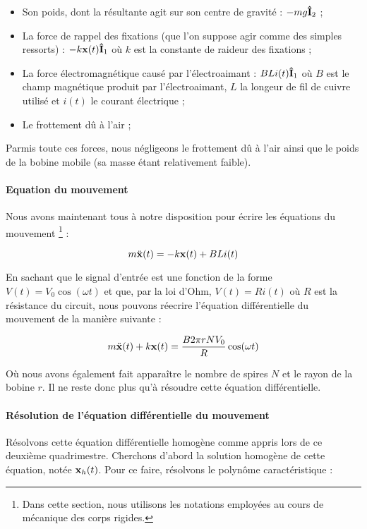 \begin{itemize}
	\item Son poids, dont la résultante agit sur son centre de gravité : $-mg{\bf\hat{ I}}_2$ ;
	\item La force de rappel des fixations (que l'on suppose agir comme des simples
	ressorts) : $-k {\bf x}(t) {\bf\hat{ I}}_1$ où $k$ est la constante de raideur des fixations ;
	\item La force électromagnétique causé par l'électroaimant : $BLi(t) {\bf\hat{ I}}_1$ où
	$B$ est le champ magnétique produit par l'électroaimant, $L$ la longeur de fil de cuivre
	utilisé et $i(t)$ le courant électrique ;
	\item Le frottement dû à l'air ;
\end{itemize}

Parmis toute ces forces, nous négligeons le frottement dû à l'air ainsi que le poids
de la bobine mobile (sa masse étant relativement faible).

\paragraph{Equation du mouvement}
Nous avons maintenant tous à notre disposition pour écrire les équations du mouvement
\footnote{Dans cette section, nous utilisons les notations employées au cours de
mécanique des corps rigides.} :

$$m\ddot{\bf x}(t) = -k{\bf x}(t) + BLi(t)$$

En sachant que le signal d'entrée est une fonction de la forme $V(t) = V_0 \cos (\omega t)$ et
que, par la loi d'Ohm, $V(t) = Ri(t)$ où $R$ est la résistance du circuit, 
nous pouvons réecrire l'équation différentielle du mouvement de la manière suivante :

$$m\ddot{\bf x}(t) + k{\bf x}(t) = \frac{B2\pi rNV_0}{R}\cos (\omega t)$$

Où nous avons également fait apparaître le nombre de spires $N$ et le rayon de la bobine
$r$. Il ne reste donc plus qu'à résoudre cette équation différentielle.

\paragraph{Résolution de l'équation différentielle du mouvement}
Résolvons cette équation différentielle homogène comme appris lors de ce deuxième
quadrimestre. Cherchons d'abord la solution homogène de cette équation, notée ${\bf x}_h(t)$.
Pour ce faire, résolvons le polynôme caractéristique :

